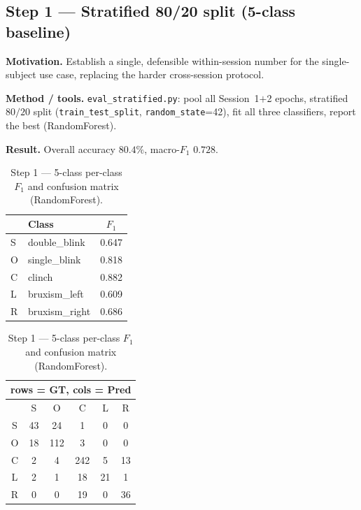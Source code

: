 \documentclass[11pt,a4paper]{article}
\newcommand{\fone}{$F_1$}
\newcommand{\code}[1]{\texttt{#1}}
\begin{document}
\subsection{Step 1 --- Stratified 80/20 split (5-class baseline)}
\textbf{Motivation.} Establish a single, defensible within-session number for the
single-subject use case, replacing the harder cross-session protocol.

\textbf{Method / tools.} \code{eval\_stratified.py}: pool all Session~1$+$2
epochs, stratified $80/20$ split (\code{train\_test\_split},
\code{random\_state}=42), fit all three classifiers, report the best (RandomForest).

\textbf{Result.} Overall accuracy $\mathbf{80.4\%}$, macro-\fone{} $0.728$.

\begin{table}[h]\centering\small
\caption{Step 1 --- 5-class per-class \fone{} and confusion matrix (RandomForest).}
\begin{minipage}{0.40\textwidth}\centering
\begin{tabular}{@{}llc@{}}
\toprule
& Class & \fone{} \\\midrule
S & double\_blink  & 0.647 \\
O & single\_blink  & 0.818 \\
C & clinch         & 0.882 \\
L & bruxism\_left  & 0.609 \\
R & bruxism\_right & 0.686 \\
\bottomrule
\end{tabular}
\end{minipage}\hfill
\begin{minipage}{0.55\textwidth}\centering
\begin{tabular}{@{}c|ccccc@{}}
\multicolumn{6}{c}{\footnotesize rows = GT, cols = Pred}\\
\toprule
 & S & O & C & L & R \\\midrule
S & 43 & 24 &  1 &  0 &  0 \\
O & 18 &112 &  3 &  0 &  0 \\
C &  2 &  4 &242 &  5 & 13 \\
L &  2 &  1 & 18 & 21 &  1 \\
R &  0 &  0 & 19 &  0 & 36 \\
\bottomrule
\end{tabular}
\end{minipage}
\end{table}
\end{document}
